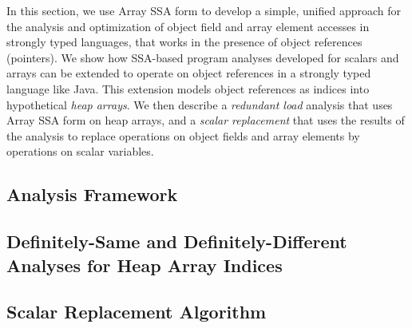 In this section, we
use Array SSA form to develop
a simple, unified approach for the analysis and
optimization of 
object field and array element accesses in strongly typed languages, 
that works in the presence of
object references (pointers).
We show how SSA-based program
analyses developed for scalars and arrays can be extended to
operate on object references in a strongly typed language like Java.
This extension models object references as
indices into hypothetical {\em heap arrays}.
We then describe a {\em redundant load} analysis
that uses Array SSA form on heap arrays, and a {\em scalar replacement}
that uses the results of the analysis to replace operations on object fields
and array elements by operations on scalar
variables.  

\subsection{Analysis Framework}\label{model}

\subsection{ Definitely-Same and Definitely-Different Analyses for Heap Array Indices}\label{svalnum}

\subsection{Scalar Replacement Algorithm}
\label{scalrep}


